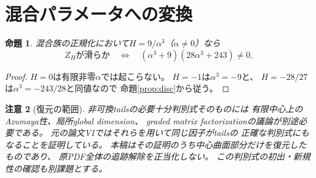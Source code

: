 \documentclass[a4paper,11pt]{ltjsarticle}
\newtheorem{proposition}{命題}[section]
\newtheorem{remark}[proposition]{注意}
\begin{document}
\section{混合パラメータへの変換}
\begin{proposition}
混合族の正規化において$H=9/\alpha^3$（$\alpha\ne0$）なら
\[
Z_H\text{が滑らか}
\quad\Longleftrightarrow\quad
(\alpha^3+9)(28\alpha^3+243)\ne0.
\]
\end{proposition}
\begin{proof}
$H=0$は有限非零$\alpha$では起こらない。
$H=-1$は$\alpha^3=-9$と、
$H=-28/27$は$\alpha^3=-243/28$と同値なので
命題\ref{prop:disc}から従う。
\end{proof}
\begin{remark}[復元の範囲]
非可換tailsの必要十分判別式そのものには
有限中心上のAzumaya性、局所global dimension、
graded matrix factorizationの議論が別途必要である。
元の論文VIではそれらを用いて同じ因子がtailsの
正確な判別式にもなることを証明している。
本稿はその証明のうち中心曲面部分だけを復元したものであり、
原PDF全体の追跡解除を正当化しない。
この判別式の初出・新規性の確認も別課題とする。
\end{remark}
\end{document}
